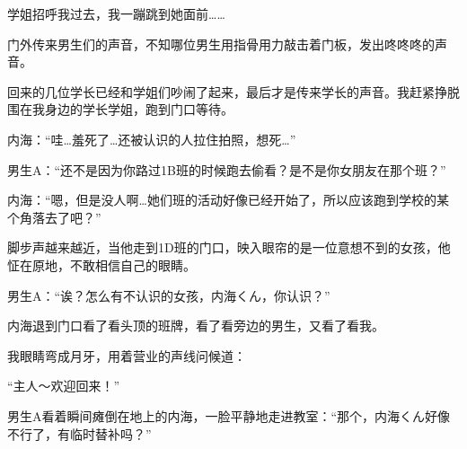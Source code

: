 学姐招呼我过去，我一蹦跳到她面前……




门外传来男生们的声音，不知哪位男生用指骨用力敲击着门板，发出咚咚咚的声音。


回来的几位学长已经和学姐们吵闹了起来，最后才是传来学长的声音。我赶紧挣脱围在我身边的学长学姐，跑到门口等待。

内海：“哇…羞死了…还被认识的人拉住拍照，想死…”

男生A：“还不是因为你路过1B班的时候跑去偷看？是不是你女朋友在那个班？”

内海：“嗯，但是没人啊…她们班的活动好像已经开始了，所以应该跑到学校的某个角落去了吧？”

脚步声越来越近，当他走到1D班的门口，映入眼帘的是一位意想不到的女孩，他怔在原地，不敢相信自己的眼睛。

男生A：“诶？怎么有不认识的女孩，内海くん，你认识？”

内海退到门口看了看头顶的班牌，看了看旁边的男生，又看了看我。

我眼睛弯成月牙，用着营业的声线问候道：

“主人～欢迎回来！”

男生A看着瞬间瘫倒在地上的内海，一脸平静地走进教室：“那个，内海くん好像不行了，有临时替补吗？”

